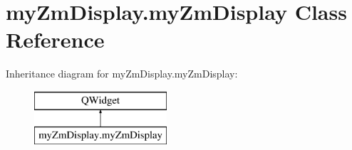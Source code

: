 \hypertarget{classmyZmDisplay_1_1myZmDisplay}{\section{my\-Zm\-Display.\-my\-Zm\-Display Class Reference}
\label{classmyZmDisplay_1_1myZmDisplay}
}
Inheritance diagram for my\-Zm\-Display.\-my\-Zm\-Display\-:\begin{figure}[H]
\begin{center}
\leavevmode
\includegraphics[height=2.000000cm]{classmyZmDisplay_1_1myZmDisplay}
\end{center}
\end{figure}
